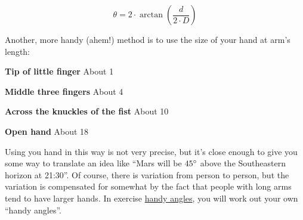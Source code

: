 \begin{equation}
\theta=2 \cdot \arctan{\left(\frac{d}{2 \cdot D}\right) }
\end{equation}


Another, more handy (ahem!) method is to use the size of your hand at
arm's length:

\textbf{Tip of little finger} About 1\degree

\textbf{Middle three fingers} About 4\degree

\textbf{Across the knuckles of the fist} About 10\degree

\textbf{Open hand} About 18\degree

Using you hand in this way is not very precise, but it's close enough to
give you some way to translate an idea like ``Mars will be $45\degree$ above the
Southeastern horizon at 21:30''. Of course, there is variation from
person to person, but the variation is compensated for somewhat by the
fact that people with long arms tend to have larger hands. In exercise
\href{Exercises\#Handy_Angles}{handy angles}, you will work out your own
``handy angles''.
